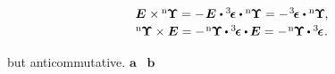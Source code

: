 \begin{otherlanguage}{russian}
\nopagebreak\vspace{-0.2em}\begin{equation*}\begin{array}{c}
\bm{E} \hspace{.1ex} \times \hspace{-0.1ex} {^\mathrm{n}\hspace{-0.12ex}\bm{\Upsilon}}
= - \hspace{.2ex} \bm{E} \hspace{.1ex} \dotp \levicivitatensor \dotp {^\mathrm{n}\hspace{-0.12ex}\bm{\Upsilon}}
= - \hspace{.2ex} \levicivitatensor \dotp {^\mathrm{n}\hspace{-0.12ex}\bm{\Upsilon}} \hspace{-0.15ex},
\\[.2em]
%
{^\mathrm{n}\hspace{-0.12ex}\bm{\Upsilon}} \times \bm{E}
= - \hspace{.2ex} {^\mathrm{n}\hspace{-0.12ex}\bm{\Upsilon}} \hspace{-0.1ex} \dotp \levicivitatensor \dotp \hspace{-0.1ex} \bm{E}
= - \hspace{.2ex} {^\mathrm{n}\hspace{-0.12ex}\bm{\Upsilon}} \hspace{-0.1ex} \dotp \levicivitatensor
\hspace{.1ex} .
\end{array}\end{equation*}

\vspace{-0.1em}
  but anticommutative.
 $\bm{a}$ ~$\bm{b}$


\end{otherlanguage}
